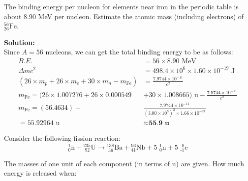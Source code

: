 \documentclass[a4paper, 12pt, addpoints]{exam}
\begin{document}
\begin{questions}
\question The binding energy per nucleon for elements near iron in the periodic table is about 8.90 MeV per nucleon. Estimate the atomic mass (including electrons) of ${}^{56}_{26}\text{Fe}$.
\begin{tcolorbox}
\textbf{Solution: } \\
Since $A = 56$ nucleons, we can get the total binding energy to be as follows:
\begin{align*}
B.E. &= 56 \times 8.90\text{ MeV} \\
\Delta mc^2 &= 498.4 \times 10^6 \times 1.60 \times 10^{-19} \text{ J} \\
(26 \times m_p + 26 \times m_e + 30 \times m_n - m_{\text{Fe}}) &= \frac{7.9744 \times 10^{-11}}{c^2} \\
m_\text{Fe} = (26 \times 1.007276 + 26 \times 0.000549 &+ 30 \times 1.008665)\text{ u} - \frac{7.9744 \times 10^{-11}}{c^2}\\
m_\text{Fe} = (56.4634)- &\frac{7.9744 \times 10^{-11}}{(3.00\times 10^8)^2\times 1.66 \times 10^{-27}} \\
= 55.92964\text{ u} & \approx \textbf{55.9 u}
\end{align*}
\end{tcolorbox}

\question Consider the following fission reaction:
$${}^1_0 \text{n} + {}^{235}_\text{ 92} \text{U} \xrightarrow{} {}^{138}_\text{ 56} \text{Ba} + {}^{93}_\text{41} \text{Nb} + 
 \text{5 } {}^{1}_0 \text{n} + \text{5 } {}^\text{ 0}_\text{-1} \text{e}$$

The masses of one unit of each component (in terms of u) are given. How much energy is released when:
\end{questions}
\end{document}
